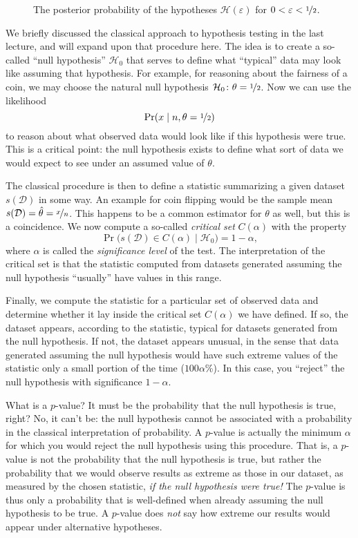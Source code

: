 \documentclass{article}
\newcommand{\given}{\mid}
\newcommand{\mc}[1]{\mathcal{#1}}
\newcommand{\data}{\mc{D}}
\begin{document}
\begin{figure}
  \centering
  
  \caption{The posterior probability of the hypotheses $\mc{H}(\varepsilon)$ for
    $0 < \varepsilon < \nicefrac{1}{2}$.}
  \label{near_fair_probabilities}
\end{figure}

We briefly discussed the classical approach to hypothesis testing in the last
lecture, and will expand upon that procedure here. The idea is to create a
so-called ``null hypothesis'' $\mc{H}_0$ that serves to define what ``typical''
data may look like assuming that hypothesis. For example, for reasoning about
the fairness of a coin, we may choose the natural null hypothesis
$\mc{H}_0\colon \theta = \nicefrac{1}{2}$. Now we can use the likelihood
\[
  \Pr(x \given n, \theta = \nicefrac{1}{2})
\]
to reason about what observed data would look like if this hypothesis were
true. This is a critical point: the null hypothesis exists to define what sort
of data we would expect to see under an assumed value of $\theta$.

The classical procedure is then to define a statistic summarizing a given
dataset $s(\data)$ in some way. An example for coin flipping would be the sample
mean $s(\data) = \hat{\theta} = \nicefrac{x}{n}$. This happens to be a common
estimator for $\theta$ as well, but this is a coincidence. We now compute a
so-called \emph{critical set} $C(\alpha)$ with the property
\[
  \Pr\bigl(s(\data) \in C(\alpha) \given \mc{H}_0\bigr) = 1 - \alpha,
\]
where $\alpha$ is called the \emph{significance level} of the test. The
interpretation of the critical set is that the statistic computed from datasets
generated assuming the null hypothesis ``usually'' have values in this range.

Finally, we compute the statistic for a particular set of observed data and
determine whether it lay inside the critical set $C(\alpha)$ we have defined. If
so, the dataset appears, according to the statistic, typical for datasets
generated from the null hypothesis. If not, the dataset appears unusual, in the
sense that data generated assuming the null hypothesis would have such extreme
values of the statistic only a small portion of the time ($100\alpha$\%). In
this case, you ``reject'' the null hypothesis with significance $1 - \alpha$.

What is a $p$-value? It must be the probability that the null hypothesis is
true, right? No, it can't be: the null hypothesis cannot be associated with a
probability in the classical interpretation of probability. A $p$-value is
actually the minimum $\alpha$ for which you would reject the null hypothesis
using this procedure. That is, a $p$-value is not the probability that the null
hypothesis is true, but rather the probability that we would observe results as
extreme as those in our dataset, as measured by the chosen statistic, \emph{if
  the null hypothesis were true!} The $p$-value is thus only a probability that
is well-defined when already assuming the null hypothesis to be true.  A
$p$-value does \emph{not} say how extreme our results would appear under
alternative hypotheses.
\end{document}
